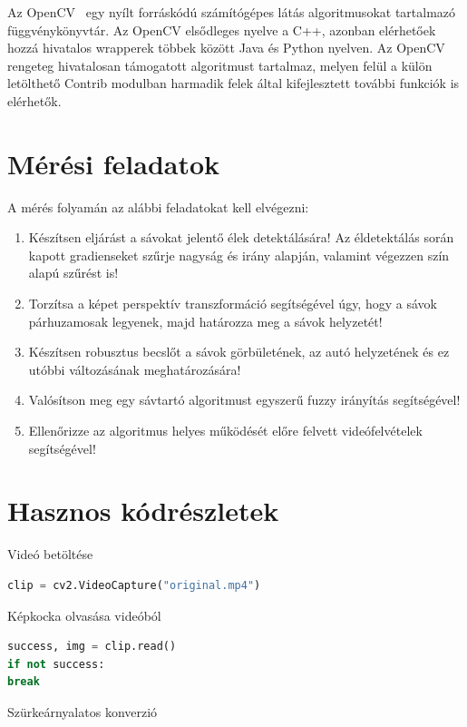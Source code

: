 \documentclass[12pt,a4paper,oneside]{report}             %
\begin{document}
Az OpenCV~\cite{opencv} egy nyílt forráskódú számítógépes látás algoritmusokat tartalmazó függvénykönyvtár. Az OpenCV elsődleges nyelve a C++, azonban elérhetőek hozzá hivatalos wrapperek többek között Java és Python nyelven. Az OpenCV rengeteg hivatalosan támogatott algoritmust tartalmaz, melyen felül a külön letölthető Contrib modulban harmadik felek által kifejlesztett további funkciók is elérhetők.

\chapter{Mérési feladatok}

A mérés folyamán az alábbi feladatokat kell elvégezni:

\begin{enumerate}
\item Készítsen eljárást a sávokat jelentő élek detektálására! Az éldetektálás során kapott gradienseket szűrje nagyság és irány alapján, valamint végezzen szín alapú szűrést is!
\item Torzítsa a képet perspektív transzformáció segítségével úgy, hogy a sávok párhuzamosak legyenek, majd határozza meg a sávok helyzetét!
\item Készítsen robusztus becslőt a sávok görbületének, az autó helyzetének és ez utóbbi változásának meghatározására!
\item Valósítson meg egy sávtartó algoritmust egyszerű fuzzy irányítás segítségével!
\item Ellenőrizze az algoritmus helyes működését előre felvett videófelvételek segítségével!
\end{enumerate}

\chapter{Hasznos kódrészletek}

Videó betöltése

\begin{lstlisting}[language=Python]
clip = cv2.VideoCapture("original.mp4")
\end{lstlisting}

Képkocka olvasása videóból

\begin{lstlisting}[language=Python]
success, img = clip.read()
if not success:
break
\end{lstlisting}

Szürkeárnyalatos konverzió
\end{document}
